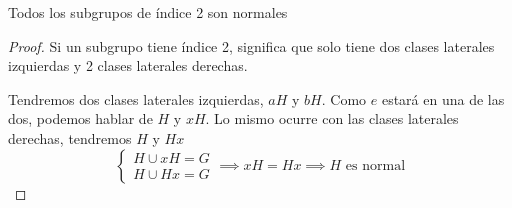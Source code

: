 \begin{thm}
    Todos los subgrupos de índice 2 son normales
\end{thm}

\begin{proof}
    Si un subgrupo tiene índice 2, significa que solo tiene dos clases laterales izquierdas y 2 clases laterales derechas.

    Tendremos dos clases laterales izquierdas, $aH$ y $bH$. Como $e$ estará en una de las dos, podemos hablar de $H$ y $xH$. Lo mismo ocurre con las clases laterales derechas, tendremos $H$ y $Hx$
    \begin{equation}
        \begin{cases}
            H \cup  xH = G\\
            H \cup Hx = G
        \end{cases} \implies xH = Hx \implies H \text{ es normal}
    \end{equation}
\end{proof}
